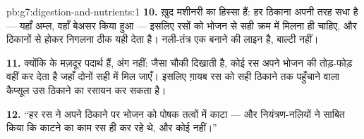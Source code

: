 \begin{solution}{pb:g7:digestion-and-nutrients:1}
\textbf{10.}  ख़ुद मशीनरी का हिस्सा हैं: हर ठिकाना अपनी
तरह सधा है --- यहाँ अम्ल, वहाँ बेअसर किया हुआ --- इसलिए रसों को भोजन से
सही क्रम में मिलना ही चाहिए, और ठिकानों से होकर निगलना ठीक यही देता है।
नली-तंत्र एक बनाने की लाइन है, बाल्टी नहीं।

\textbf{11.} क्योंकि  के मज़दूर पदार्थ हैं, अंग नहीं: जैसा चौकी
दिखाती है, कोई रस अपने भोजन की तोड़-फोड़ वहीं कर देता है जहाँ दोनों सही
 में मिल जाएँ। इसलिए ग़ायब रस को सही ठिकाने तक पहुँचाने वाला
कैप्सूल उस ठिकाने का रसायन कर सकता है।

\textbf{12.} ``हर रस ने अपने ठिकाने पर भोजन को पोषक तत्वों में काटा ---
और नियंत्रण-नलियों ने साबित किया कि काटने का काम रस ही कर रहे थे, और
कोई नहीं।''
\end{solution}
